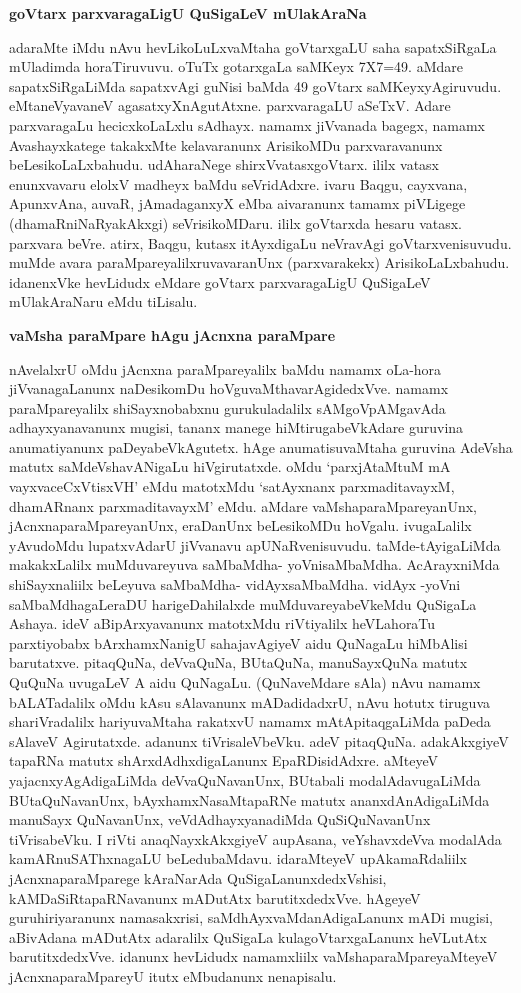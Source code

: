 {\bf goVtarx parxvaragaLigU QuSigaLeV mUlakAraNa}

adaraMte iMdu nAvu hevLikoLuLxvaMtaha goVtarxgaLU saha sapatxSiRgaLa mUladimda horaTiruvuvu. oTuTx gotarxgaLa saMKeyx {\rm 7X7=49.} aMdare sapatxSiRgaLiMda sapatxvAgi guNisi baMda {\rm 49} goVtarx saMKeyxyAgiruvudu. eMtaneVyavaneV agasatxyXnAgutAtxne. parxvaragaLU aSeTxV. Adare parxvaragaLu hecicxkoLaLxlu sAdhayx. namamx jiVvanada bagegx, namamx Avashayxkatege takakxMte kelavaranunx ArisikoMDu parxvaravanunx beLesikoLaLxbahudu. udAharaNege shirxVvatasxgoVtarx. ililx vatasx enunxvavaru elolxV madheyx baMdu seVridAdxre. ivaru Baqgu, cayxvana, ApunxvAna, auvaR, jAmadaganxyX eMba aivaranunx tamamx piVLigege (dhamaRniNaRyakAkxgi) seVrisikoMDaru. ililx goVtarxda hesaru vatasx. parxvara beVre. atirx, Baqgu, kutasx itAyxdigaLu neVravAgi goVtarxvenisuvudu. muMde avara paraMpareyalilxruvavaranUnx (parxvarakekx) ArisikoLaLxbahudu. idanenxVke hevLidudx eMdare goVtarx parxvaragaLigU QuSigaLeV mUlakAraNaru eMdu tiLisalu.

{\bf vaMsha paraMpare hAgu jAcnxna paraMpare}

nAvelalxrU oMdu jAcnxna paraMpareyalilx baMdu namamx oLa-hora jiVvanagaLanunx naDesikomDu hoVguvaMthavarAgidedxVve. namamx paraMpareyalilx shiSayxnobabxnu gurukuladalilx sAMgoVpAMgavAda adhayxyanavanunx mugisi, tananx manege hiMtirugabeVkAdare guruvina anumatiyanunx paDeyabeVkAgutetx. hAge anumatisuvaMtaha guruvina AdeVsha matutx saMdeVshavANigaLu hiVgirutatxde. oMdu `parxjAtaMtuM mA vayxvaceCxVtisxVH' eMdu matotxMdu `satAyxnanx parxmaditavayxM, dhamARnanx parxmaditavayxM' eMdu. aMdare vaMshaparaMpareyanUnx, jAcnxnaparaMpareyanUnx, eraDanUnx beLesikoMDu hoVgalu. ivugaLalilx yAvudoMdu lupatxvAdarU jiVvanavu apUNaRvenisuvudu. taMde-tAyigaLiMda makakxLalilx muMduvareyuva saMbaMdha- yoVnisaMbaMdha. AcArayxniMda shiSayxnaliilx beLeyuva saMbaMdha- vidAyxsaMbaMdha. vidAyx -yoVni saMbaMdhagaLeraDU harigeDahilalxde muMduvareyabeVkeMdu QuSigaLa Ashaya. ideV aBipArxyavanunx matotxMdu riVtiyalilx heVLahoraTu parxtiyobabx bArxhamxNanigU sahajavAgiyeV aidu QuNagaLu hiMbAlisi barutatxve. pitaqQuNa, deVvaQuNa, BUtaQuNa, manuSayxQuNa matutx QuQuNa uvugaLeV A aidu QuNagaLu. (QuNaveMdare sAla) nAvu namamx bALATadalilx oMdu kAsu sAlavanunx mADadidadxrU, nAvu hotutx tiruguva shariVradalilx hariyuvaMtaha rakatxvU namamx mAtApitaqgaLiMda paDeda sAlaveV Agirutatxde. adanunx tiVrisaleVbeVku. adeV pitaqQuNa. adakAkxgiyeV tapaRNa matutx shArxdAdhxdigaLanunx EpaRDisidAdxre. aMteyeV yajacnxyAgAdigaLiMda deVvaQuNavanUnx, BUtabali modalAdavugaLiMda BUtaQuNavanUnx, bAyxhamxNasaMtapaRNe matutx ananxdAnAdigaLiMda manuSayx QuNavanUnx, veVdAdhayxyanadiMda QuSiQuNavanUnx tiVrisabeVku. I riVti anaqNayxkAkxgiyeV aupAsana, veYshavxdeVva modalAda kamARnuSAThxnagaLU beLedubaMdavu. idaraMteyeV upAkamaRdaliilx jAcnxnaparaMparege kAraNarAda QuSigaLanunxdedxVshisi, kAMDaSiRtapaRNavanunx mADutAtx barutitxdedxVve. hAgeyeV guruhiriyaranunx namasakxrisi, saMdhAyxvaMdanAdigaLanunx mADi mugisi, aBivAdana mADutAtx adaralilx QuSigaLa kulagoVtarxgaLanunx heVLutAtx barutitxdedxVve. idanunx hevLidudx namamxliilx vaMshaparaMpareyaMteyeV jAcnxnaparaMpareyU itutx eMbudanunx nenapisalu.

